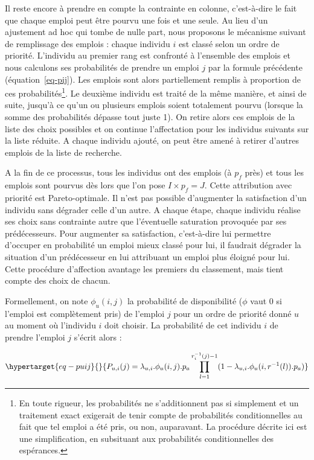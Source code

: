 \documentclass[
  10pt,
  a4paper,
  numbers=noendperiod,
  DIV=12]{scrartcl}
\begin{document}
Il reste encore à prendre en compte la contrainte en colonne,
c'est-à-dire le fait que chaque emploi peut être pourvu une fois et une
seule. Au lieu d'un ajustement ad hoc qui tombe de nulle part, nous
proposons le mécanisme suivant de remplissage des emplois : chaque
individu \(i\) est classé selon un ordre de priorité. L'individu au
premier rang est confronté à l'ensemble des emplois et nous calculons
ses probabilités de prendre un emploi \(j\) par la formule précédente
(équation~\ref{eq-pij}). Les emplois sont alors partiellement remplis à
proportion de ces probabilités\footnote{En toute rigueur, les
  probabilités ne s'additionnent pas si simplement et un traitement
  exact exigerait de tenir compte de probabilités conditionnelles au
  fait que tel emploi a été pris, ou non, auparavant. La procédure
  décrite ici est une simplification, en subsituant aux probabilités
  conditionnelles des espérances.}. Le deuxième individu est traité de
la même manière, et ainsi de suite, jusqu'à ce qu'un ou plusieurs
emplois soient totalement pourvu (lorsque la somme des probabilités
dépasse tout juste 1). On retire alors ces emplois de la liste des choix
possibles et on continue l'affectation pour les individus suivants sur
la liste réduite. A chaque individu ajouté, on peut être amené à retirer
d'autres emplois de la liste de recherche.

A la fin de ce processus, tous les individus ont des emplois (à \(p_f\)
près) et tous les emplois sont pourvus dès lors que l'on pose
\(I \times p_f = J\). Cette attribution avec priorité est
Pareto-optimale. Il n'est pas possible d'augmenter la satisfaction d'un
individu sans dégrader celle d'un autre. A chaque étape, chaque individu
réalise ses choix sans contrainte autre que l'éventuelle saturation
provoquée par ses prédécesseurs. Pour augmenter sa satisfaction,
c'est-à-dire lui permettre d'occuper en probabilité un emploi mieux
classé pour lui, il faudrait dégrader la situation d'un prédécesseur en
lui attribuant un emploi plus éloigné pour lui. Cette procédure
d'affection avantage les premiers du classement, mais tient compte des
choix de chacun.

Formellement, on note \(\phi_u(i,j)\) la probabilité de disponibilité
(\(\phi\) vaut 0 si l'emploi est complètement pris) de l'emploi \(j\)
pour un ordre de priorité donné \(u\) au moment où l'individu \(i\) doit
choisir. La probabilité de cet individu \(i\) de prendre l'emploi \(j\)
s'écrit alors :

\begin{equation}\protect\hypertarget{eq-puij}{}{
P_{u, i}(j) = \lambda_{u,i}.\phi_u(i,j). p_a \prod_{l=1}^{r_i^{-1}(j)-1}(1-\lambda_{u,i}. \phi_u(i,r^{-1}(l)).p_a)
}\label{eq-puij}\end{equation}
\end{document}

